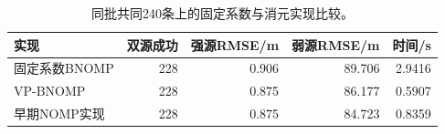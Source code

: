 \begin{table}[H]\centering\small
\caption{同批共同240条上的固定系数与消元实现比较。}\label{tab:profile}
\begin{tabular}{@{}lrrrr@{}}\toprule
实现 & 双源成功 & 强源RMSE/m & 弱源RMSE/m & 时间/s\\\midrule
固定系数BNOMP & 228 & 0.906 & 89.706 & 2.9416\\
VP-BNOMP & 228 & 0.875 & 86.177 & 0.5907\\
早期NOMP实现 & 228 & 0.875 & 84.723 & 0.8359\\
\bottomrule\end{tabular}\end{table}
